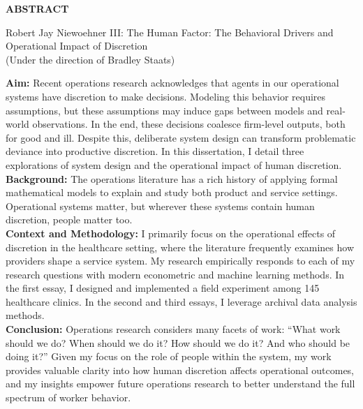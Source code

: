 

\begin{center}
\vspace*{52pt}                  %
{\normalfont\textbf{ABSTRACT}}
\vspace{11pt}

\begin{singlespace}
Robert Jay Niewoehner III: The Human Factor: The Behavioral Drivers and Operational Impact of Discretion \\
(Under the direction of Bradley Staats)
\end{singlespace}
\end{center}


\noindent
\textbf{Aim:} Recent operations research acknowledges that agents in our operational systems have discretion to make decisions. Modeling this behavior requires assumptions, but these assumptions may induce gaps between models and real-world observations. In the end, these decisions coalesce firm-level outputs, both for good and ill. Despite this, deliberate system design can transform problematic deviance into productive discretion. In this dissertation, I detail three explorations of system design and the operational impact of human discretion. \\
\textbf{Background:} The operations literature has a rich history of applying formal mathematical models to explain and study both product and service settings. Operational systems matter, but wherever these systems contain human discretion, people matter too. \\
\textbf{Context and Methodology:} I primarily focus on the operational effects of discretion in the healthcare setting, where the literature frequently examines how providers shape a service system. My research empirically responds to each of my research questions with modern econometric and machine learning methods. In the first essay, I designed and implemented a field experiment among 145 healthcare clinics. In the second and third essays, I leverage archival data analysis methods. \\
\textbf{Conclusion:} Operations research considers many facets of work: “What work should we do? When should we do it? How should we do it? And who should be doing it?” Given my focus on the role of people within the system, my work provides valuable clarity into how human discretion affects operational outcomes, and my insights empower future operations research to better understand the full spectrum of worker behavior. \\


\clearpage
